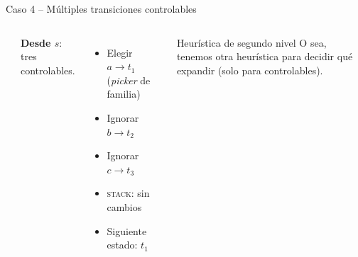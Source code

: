 \documentclass{beamer}
\begin{document}
\begin{frame}{Caso 4 -- M\'ultiples transiciones controlables}
\begin{columns}[c]
\begin{center}
\end{center}

\textbf{Desde $s$}: tres controlables.

\medskip
\begin{itemize}
  \item[\textcolor{cChosen}{$\blacktriangleright$}] Elegir $a \to t_1$ (\emph{picker} de familia)
  \item[\textcolor{cIgnore}{$\blacktriangleright$}] Ignorar $b \to t_2$
  \item[\textcolor{cIgnore}{$\blacktriangleright$}] Ignorar $c \to t_3$
  \item \textsc{stack}: sin cambios
  \item Siguiente estado: $t_1$
\end{itemize}

\medskip
\begin{block}{Heur\'istica de segundo nivel}
O sea, tenemos otra heur\'istica para decidir qu\'e expandir (solo para controlables).
\end{block}
\end{columns}
\end{frame}
\end{document}
